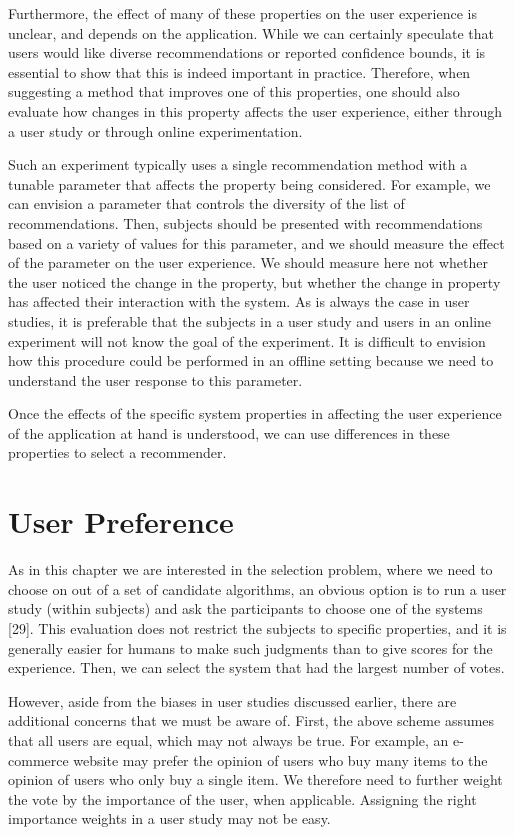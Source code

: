 Furthermore, the effect of many of these properties on the user experience is unclear, and depends on the application. While we can certainly speculate that users would like diverse recommendations or reported confidence bounds, it is essential to show that this is indeed important in practice. Therefore, when suggesting a method that improves one of this properties, one should also evaluate how changes in this property affects the user experience, either through a user study or through online experimentation.

Such an experiment typically uses a single recommendation method with a tunable parameter that affects the property being considered. For example, we can envision a parameter that controls the diversity of the list of recommendations. Then, subjects should be presented with recommendations based on a variety of values for this parameter, and we should measure the effect of the parameter on the user experience. We should measure here not whether the user noticed the change in the property, but whether the change in property has affected their interaction with the system. As is always the case in user studies, it is preferable that the subjects in a user study and users in an online experiment will not know the goal of the experiment. It is difficult to envision how this procedure could be performed in an offline setting because we need to understand the user response to this parameter.

Once the effects of the specific system properties in affecting the user experience of the application at hand is understood, we can use differences in these properties to select a recommender.


\section{User Preference}

As in this chapter we are interested in the selection problem, where we need to choose on out of a set of candidate algorithms, an obvious option is to run a user study (within subjects) and ask the participants to choose one of the systems [29]. This evaluation does not restrict the subjects to specific properties, and it is generally easier for humans to make such judgments than to give scores for the experience. Then, we can select the system that had the largest number of votes.

However, aside from the biases in user studies discussed earlier, there are additional concerns that we must be aware of. First, the above scheme assumes that all users are equal, which may not always be true. For example, an e-commerce website may prefer the opinion of users who buy many items to the opinion of users who only buy a single item. We therefore need to further weight the vote by the importance of the user, when applicable. Assigning the right importance weights in a user study may not be easy.

